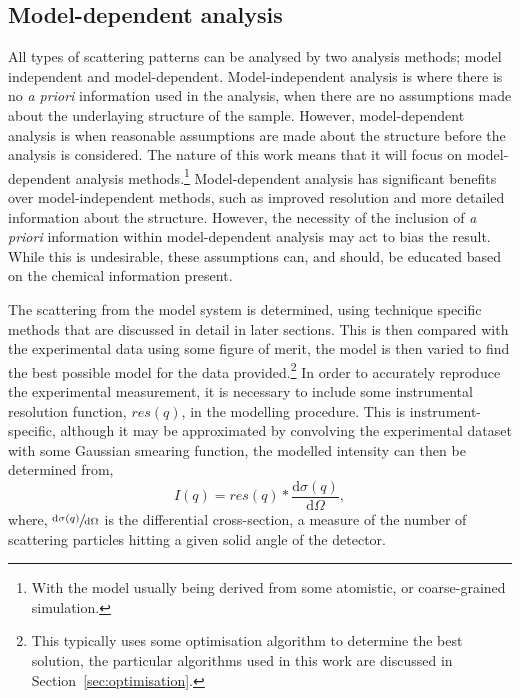 \subsection{Model-dependent analysis}
\label{sec:moddep}
All types of scattering patterns can be analysed by two analysis methods; model independent and model-dependent.
Model-independent analysis is where there is no \emph{a priori} information used in the analysis, when there are no assumptions made about the underlaying structure of the sample. 
However, model-dependent analysis is when reasonable assumptions are made about the structure before the analysis is considered. 
The nature of this work means that it will focus on model-dependent analysis methods.\footnote{With the model usually being derived from some atomistic, or coarse-grained simulation.}
Model-dependent analysis has significant benefits over model-independent methods, such as improved resolution and more detailed information about the structure.
However, the necessity of the inclusion of \emph{a priori} information within model-dependent analysis may act to bias the result.
While this is undesirable, these assumptions can, and should, be educated based on the chemical information present.

The scattering from the model system is determined, using technique specific methods that are discussed in detail in later sections.
This is then compared with the experimental data using some figure of merit, the model is then varied to find the best possible model for the data provided.\footnote{This typically uses some optimisation algorithm to determine the best solution, the particular algorithms used in this work are discussed in Section~\ref{sec:optimisation}.}
In order to accurately reproduce the experimental measurement, it is necessary to include some instrumental resolution function, $res(q)$, in the modelling procedure.
This is instrument-specific, although it may be approximated by convolving the experimental dataset with some Gaussian smearing function, the modelled intensity can then be determined from,
%
\begin{equation}
    I(q) = res(q) * \frac{\text{d}\sigma(q)}{\text{d}\Omega},
\end{equation}
%
where, $\sfrac{\text{d}\sigma(q)}{\text{d}\Omega}$ is the differential cross-section, a measure of the number of scattering particles hitting a given solid angle of the detector.

